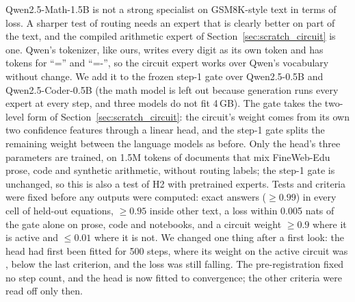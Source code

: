 \documentclass[10pt]{article}
\begin{document}
Qwen2.5-Math-1.5B is not a strong specialist on GSM8K-style text in terms of loss. A sharper
test of routing needs an expert that is clearly better on part of the text, and the compiled
arithmetic expert of Section~\ref{sec:scratch_circuit} is one. Qwen's tokenizer, like ours,
writes every digit as its own token and has tokens for ``='' and ``=-'', so the circuit expert
works over Qwen's vocabulary without change. We add it to the frozen step-1 gate over
Qwen2.5-0.5B and Qwen2.5-Coder-0.5B (the math model is left out because generation runs every
expert at every step, and three models do not fit 4\,GB). The gate takes the two-level form of
Section~\ref{sec:scratch_circuit}: the circuit's weight comes from its own two confidence
features through a linear head, and the step-1 gate splits the remaining weight between the
language models as before. Only the head's three parameters are trained, on 1.5M tokens of
documents that mix FineWeb-Edu prose, code and synthetic arithmetic, without routing labels;
the step-1 gate is unchanged, so this is also a test of H2 with pretrained experts. Tests and
criteria were fixed before any outputs were computed: exact answers ($\geq 0.99$) in every
cell of held-out equations, $\geq 0.95$ inside other text, a loss within 0.005 nats of the
gate alone on prose, code and notebooks, and a circuit weight $\geq 0.9$ where it is active
and $\leq 0.01$ where it is not. We changed one thing after a first look: the head had first
been fitted for 500 steps, where its weight on the active circuit was \resTrackBCircLamOnFiveHundred{}, below the last
criterion, and the loss was still falling. The pre-registration fixed no step count, and the
head is now fitted to convergence; the other criteria were read off only then.
\end{document}
